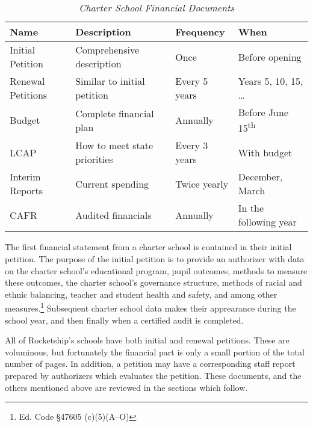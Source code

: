 \begin{table}[ht]
  \caption[Charter School Financial Documents]{\textit{Charter School Financial Documents}}%
  \label{tab:charter-fin-docs}%
  \begin{tabular}{llll}
    \toprule
    \textbf{Name}  & \textbf{Description} & \textbf{Frequency} & \textbf{When} \\
    \midrule
    Initial Petition  & Comprehensive description    & Once           & Before opening\vspace{1ex}\\
    Renewal Petitions & Similar to initial petition  & Every 5 years  & Years 5, 10, 15, \ldots\vspace{1ex}\\
    Budget            & Complete financial plan      & Annually       & Before June 15\textsuperscript{th} \vspace{1ex}\\
    LCAP              & How to meet state priorities & Every 3 years  & With budget\vspace{1ex}\\
    Interim Reports   & Current spending             & Twice yearly   & December, March\vspace{1ex}\\
    CAFR              & Audited financials           & Annually       & In the following year \\
    \bottomrule
  \end{tabular}
\end{table}
%
%
%
%
%
%

The first financial statement from a charter school is contained in their initial petition. The purpose of the initial petition is to provide an authorizer with data on the charter school's educational program, pupil outcomes, methods to measure these outcomes, the charter school's governance structure, methods of racial and ethnic balancing, teacher and student health and safety, and among other measures.\footnote{Ed. Code §47605 (c)(5)(A–O)} Subsequent charter school data makes their apprearance during the school year, and then finally when a certified audit is completed.

All of Rocketship's schools have both initial and renewal petitions. These are voluminous, but fortunately the financial part is only a small portion of the total number of pages. In addition, a petition may have a corresponding staff report prepared by authorizers which evaluates the petition. These documents, and the others mentioned above are reviewed in the sections which follow.


